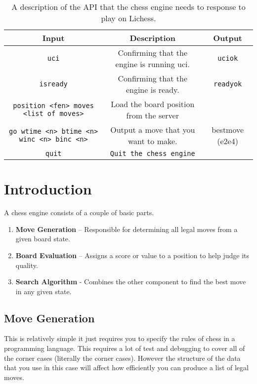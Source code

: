 \documentclass[sigconf]{acmart}
\begin{document}
\begin{table*}[h]
    \centering
    \renewcommand{\arraystretch}{1.2}
    \setlength{\tabcolsep}{8pt}
    \begin{tabular}{|c|c|c|}
        \hline
        \textbf{Input} & \textbf{Description} & \textbf{Output} \\
        \hline
        \texttt{uci} & Confirming that the engine is running uci. & \texttt{uciok} \\
        \hline
        \texttt{isready} & Confirming that the engine is ready. & \texttt{readyok} \\
        \hline
        \texttt{position <fen> moves <list of moves>} & Load the board position from the server & \\
        \hline
        \texttt{go wtime <n> btime <n> winc <n> binc <n>} & Output a move that you want to make. & bestmove (e2e4) \\
        \hline
        \texttt{quit} & \texttt{Quit the chess engine} & \\
        \hline
    \end{tabular}
    \caption{A description of the API that the chess engine needs to response to play on Lichess.}
    \label{tab:api}
\end{table*}


\section{Introduction}
A chess engine consists of a couple of basic parts.
\begin{enumerate}
    \item \textbf{Move Generation} – Responsible for determining all legal moves from a given board state.
    \item \textbf{Board Evaluation} – Assigns a score or value to a position to help judge its quality.
    \item \textbf{Search Algorithm} - Combines the other component to find the best move in any given state.
\end{enumerate}

\subsection{Move Generation}
This is relatively simple it just requires you to specify the rules of chess in a programming language.
This requires a lot of test and debugging to cover all of the corner cases (literally the corner cases).
However the structure of the data that you use in this case will affect how efficiently you can produce a list of legal moves. 
\end{document}
